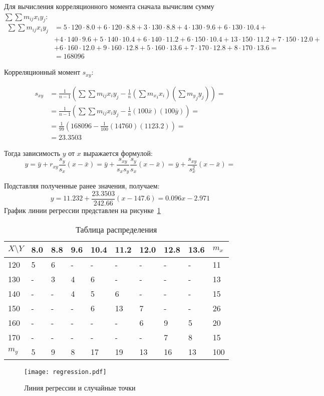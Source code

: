 \documentclass{article}
\theoremstyle{problemstyle}
\begin{document}
Для вычисления корреляционного момента сначала вычислим сумму $ \sum \sum m_{ij} x_i y_j $:
\begin{align*}
  \sum \sum m_{ij} x_i y_j &= 5 \cdot 120 \cdot 8.0 + 6 \cdot 120 \cdot 8.8 +
  3 \cdot 130 \cdot 8.8 + 4 \cdot 130 \cdot 9.6 + 6 \cdot 130 \cdot 10.4    + \\
  &+ 4 \cdot 140 \cdot 9.6 + 5 \cdot 140 \cdot 10.4 + 6 \cdot 140 \cdot 11.2 +
   6 \cdot 150 \cdot 10.4 + 13 \cdot 150 \cdot 11.2 + 7 \cdot 150 \cdot 12.0 + \\
  &+ 6 \cdot 160 \cdot 12.0 + 9 \cdot 160 \cdot 12.8 + 5 \cdot 160 \cdot 13.6  +
  7 \cdot 170 \cdot 12.8 + 8 \cdot 170 \cdot 13.6 = \\
  &= 168096
\end{align*}

Корреляционный момент $s_{xy}$:


\begin{align*}
  s_{xy} &=
  \frac{1}{n-1} \left( \sum \sum m_{ij} x_i y_j - \frac{1}{n} \left(\sum {m_x}_i x_i \right)\left(\sum {m_y}_j y_j \right) \right) = \\
  &= \frac{1}{n-1} \left( \sum \sum m_{ij} x_i y_j - \frac{1}{n} (100 \bar x) (100 \bar y) \right) = \\
  &= \frac{1}{99} \left( 168096 - \frac{1}{100} (14760) (1123.2) \right) = \\
  &= 23.3503
\end{align*}

Тогда зависимость $y$ от $x$ выражается формулой:
\[
  y = 
  \bar y + r_{xy} \frac{s_y}{s_x} (x - \bar x) =
  \bar y + \frac{s_{xy}}{s_x s_y} \frac{s_y}{s_x} (x - \bar x) = 
  \bar y + \frac{s_{xy}}{s_x^2} (x - \bar x) =
\]

Подставляя полученные ранее значения, получаем:
\[
  y = 11.232 + \frac{23.3503}{242.66} (x - 147.6) =
      0.096 x - 2.971
\]
График линии регрессии представлен на рисунке~\ref{fig:regression}

\begin{table}[H]
  \centering
  \begin{tabular}{|l|l|l|l|l|l|l|l|l|l|}
    \hline
    $X \setminus Y$ & 8.0 & 8.8 & 9.6 & 10.4 & 11.2 & 12.0 & 12.8 & 13.6 & $m_x$ \\ 
    \hline
    120             & 5 & 6 & - & - & - & - & - & - & 11 \\ 
    130 & - & 3 & 4 & 6 & - & - & - & - & 13 \\ 
    140 & - & - & 4 & 5 & 6 & - & - & - & 15 \\
    150 & - & - & - & 6 & 13 & 7 & - & - & 26 \\
    160 & - & - & - & - & - & 6 & 9 & 5 & 20 \\ 
    170 & - & - & - & - & - & - & 7 & 8 & 15 \\
    \hline
    $m_y$ & 5 & 9 & 8 & 17 & 19 & 13 & 16 & 13 & 100 \\
    \hline
    
  \end{tabular}
  \caption{Таблица распределения}\label{tab:2_data}
\end{table}

\begin{figure}[H]
  \centering
  \texttt{[image: regression.pdf]}
  \caption{Линия регрессии и случайные точки}\label{fig:regression}
\end{figure}
\end{document}
